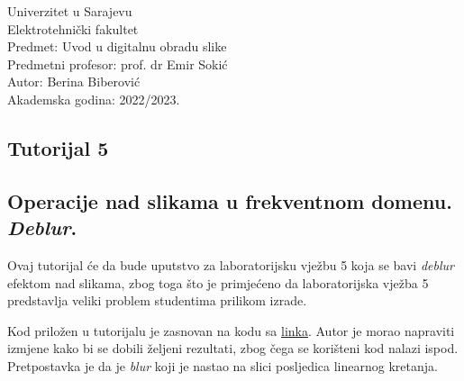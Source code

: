 \documentclass[a4paper, 12pt]{article}
\begin{document}
\noindent
Univerzitet u Sarajevu\\
Elektrotehnički fakultet\\
Predmet: Uvod u digitalnu obradu slike\\
Predmetni profesor: prof. dr Emir Sokić\\
Autor: Berina Biberović\\
Akademska godina: 2022/2023.


\begin{center}
    \section*{Tutorijal 5}
    \subsection*{Operacije nad slikama u frekventnom domenu. \textit{Deblur}.}
\end{center}

Ovaj tutorijal će da bude uputstvo za laboratorijsku vježbu 5 koja se bavi \textit{deblur} efektom nad slikama, zbog toga što je primjećeno da laboratorijska vježba 5 predstavlja veliki problem studentima prilikom izrade.

Kod priložen u tutorijalu je zasnovan na kodu sa \href{https://docs.opencv.org/3.4/d1/dfd/tutorial_motion_deblur_filter.html}{linka}. Autor je morao napraviti izmjene kako bi se dobili željeni rezultati, zbog čega se korišteni kod nalazi ispod. Pretpostavka je da je \textit{blur} koji je nastao na slici posljedica linearnog kretanja.
\end{document}
